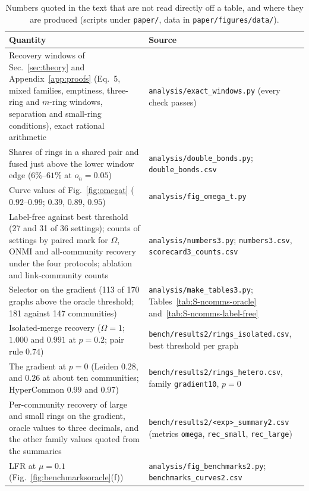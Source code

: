 \begin{table}[p]
\caption{Numbers quoted in the text that are not read directly off a table, and where they
are produced (scripts under \texttt{paper/}, data in \texttt{paper/figures/data/}).}
\label{tab:S-diagnostics}
\scriptsize
\begin{ruledtabular}
\begin{tabular}{p{}p{}}
Quantity & Source \\
\hline
Recovery windows of Sec.~\ref{sec:theory} and Appendix~\ref{app:proofs} (Eq.~5, mixed families, emptiness, three-ring
and $m$-ring windows, separation and small-ring conditions), exact rational arithmetic &
\texttt{analysis/exact\_windows.py} (every check passes) \\
Shares of rings in a shared pair and fused just above the lower window edge
($6\%$--$61\%$ at $o_n=0.05$) & \texttt{analysis/double\_bonds.py}; \texttt{double\_bonds.csv} \\
Curve values of Fig.~\ref{fig:omegat} ($0.92$--$0.99$; $0.39$, $0.89$, $0.95$) &
\texttt{analysis/fig\_omega\_t.py} \\
Label-free against best threshold (27 and 31 of 36 settings); counts of settings by
paired mark for $\Omega$, ONMI and all-community recovery under the four protocols;
ablation and link-community counts & \texttt{analysis/numbers3.py}; \texttt{numbers3.csv},
\texttt{scorecard3\_counts.csv} \\
Selector on the gradient (113 of 170 graphs above the oracle threshold; 181 against 147
communities) & \texttt{analysis/make\_tables3.py}; Tables~\ref{tab:S-ncomms-oracle}
and~\ref{tab:S-ncomms-label-free} \\
Isolated-merge recovery ($\Omega=1$; $1.000$ and $0.991$ at $p=0.2$; pair rule $0.74$) &
\texttt{bench/results2/rings\_isolated.csv}, best threshold per graph \\
The gradient at $p=0$ (Leiden $0.28$, and $0.26$ at about ten communities; HyperCommon
$0.99$ and $0.97$) & \texttt{bench/results2/rings\_hetero.csv}, family
\texttt{gradient10}, $p=0$ \\
Per-community recovery of large and small rings on the gradient, oracle values to three
decimals, and the other family values quoted from the summaries &
\texttt{bench/results2/<exp>\_summary2.csv} (metrics \texttt{omega}, \texttt{rec\_small},
\texttt{rec\_large}) \\
LFR at $\mu=0.1$ (Fig.~\ref{fig:benchmarksoracle}(f)) &
\texttt{analysis/fig\_benchmarks2.py}; \texttt{benchmarks\_curves2.csv} \\

\end{tabular}
\end{ruledtabular}
\end{table}
